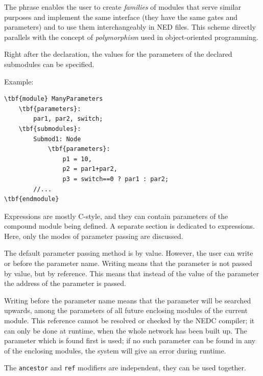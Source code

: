 The  phrase enables the user to
create \textit{families} of modules that serve
similar purposes and implement the same interface (they have the same
gates and parameters) and to use them interchangeably in NED files.
This scheme directly parallels with the concept of
\textit{polymorphism} used in object-oriented programming.



Right after the declaration, the values for the parameters of
the declared submodules can be specified.

Example:


\begin{Verbatim}[commandchars=\\\{\}]
\tbf{module} ManyParameters
    \tbf{parameters}:
        par1, par2, switch;
    \tbf{submodules}:
        Submod1: Node
            \tbf{parameters}:
                p1 = 10,
                p2 = par1+par2,
                p3 = switch==0 ? par1 : par2;
        //...
\tbf{endmodule}
\end{Verbatim}

Expressions are mostly C-style, and they can
contain parameters of the compound module being defined. A separate
section is dedicated to expressions. Here, only the modes of parameter
passing are discussed.

The default parameter passing method is by value. However, the
user can write  or
 before the parameter name.
Writing  means that the parameter is not
passed by value, but by reference.  This means that instead of the
value of the parameter the address of the parameter is passed.

Writing  before the parameter
name means that the parameter will be searched upwards, among the
parameters of all future enclosing modules of the current module. This
reference cannot be resolved or checked by the NEDC compiler; it can
only be done at runtime, when the whole network has been built up. The
parameter which is found first is used; if no such parameter can be
found in any of the enclosing modules, the system will give an error
during runtime.

The \texttt{ancestor} and \texttt{ref} modifiers are independent, they
can be used together.


